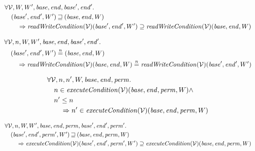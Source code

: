\documentclass{article}
\newcommand{\nequal}[1][n]{\stackrel{\tiny{#1}}{=}}
\newcommand{\var}[1]{\mathit{#1}}
\newcommand{\start}{\var{base}}
\newcommand{\addrend}{\var{end}}
\newcommand{\perm}{\var{perm}}
\newcommand{\plainfun}[2]{
  \ifthenelse{\equal{#2}{}}
             {\mathit{#1}}
             {\mathit{#1}(#2)}
}
\newcommand{\writeCond}[1]{\plainfun{readWriteCondition}{#1}}
\newcommand{\execCond}[1]{\plainfun{executeCondition}{#1}}
\newcommand{\future}{\mathbin{\sqsupseteq}}
\newcommand{\asmType}{\plaindom{AsmType}}
\newcommand{\plaindom}[1]{\mathrm{#1}}
\newcommand{\intr}[2]{\mathcal{#1}}
\newcommand{\valueintr}[1]{\intr{V}{#1}}
\newcommand{\stdvr}{\valueintr{\asmType}}
\begin{document}
\begin{lemma}
\label{lem:wc-mono-world}
  \begin{align*}
    &\forall \stdvr,W,W',\start, \addrend, \start',\addrend' \ldotp \\
    &\quad  (\start',\addrend',W') \future (\start,\addrend,W) \\
    &\qquad \Rightarrow \writeCond{}(\stdvr)(\start',\addrend',W') \supseteq \writeCond{}(\stdvr)(\start,\addrend,W)
  \end{align*}
\end{lemma}

\begin{lemma}
  \label{lem:wc-ne-world}
  \begin{align*}
    &\forall \stdvr, n,W,W',\start, \addrend, \start',\addrend' \ldotp \\
    &\quad  (\start',\addrend',W') \nequal (\start,\addrend,W) \\
    &\qquad \Rightarrow \writeCond{}(\stdvr)(\start,\addrend,W) \nequal \writeCond{}(\stdvr)(\start',\addrend',W')
  \end{align*}
\end{lemma}

\begin{lemma}
\label{lem:ec-dc}
  \begin{align*}
    &\forall \stdvr, n,n',W,\start, \addrend, \perm \ldotp \\
    &\quad  n \in \execCond{}(\stdvr)(\start,\addrend,\perm,W) \land \\
    &\quad  n' \leq n \\
    &\qquad \Rightarrow n' \in \execCond{}(\stdvr)(\start,\addrend,\perm,W)
  \end{align*}
\end{lemma}

\begin{lemma}
\label{lem:ec-mono-world}
  \begin{align*}
    &\forall \stdvr,n,W, W',\start, \addrend, \perm,\start', \addrend', \perm' \ldotp \\
    &\quad  (\start',\addrend',\perm',W') \future (\start,\addrend,\perm,W) \\
    &\qquad \Rightarrow \execCond{}(\stdvr)(\start',\addrend',\perm',W') \supseteq \execCond{}(\stdvr)(\start,\addrend,\perm,W)
  \end{align*}
\end{lemma}
\end{document}

